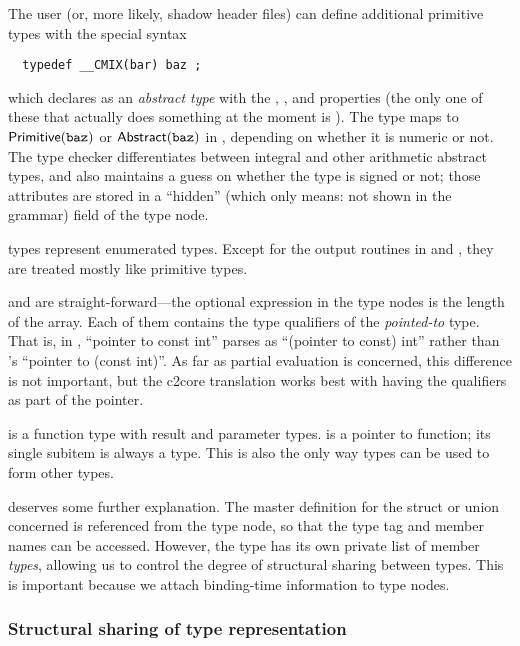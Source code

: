 \begin{docpart}
The user (or, more likely, shadow header files) can define additional
primitive types with the special syntax
\begin{verbatim}
  typedef __CMIX(bar) baz ;
\end{verbatim}
which declares  as an \emph{abstract type} with the ,
, and  properties (the only one of these that
actually does something at the moment is ). The type
maps to $\textsf{Primitive}(\texttt{baz})$ or
$\textsf{Abstract}(\texttt{baz})$ in \coreC, depending on whether
it is numeric or not. The type checker differentiates between integral
and other arithmetic abstract types, and also maintains a guess on
whether the type is signed or not; those attributes are stored in
a ``hidden'' (which only means: not shown in the \coreC grammar)
field of the  type node.

 types represent enumerated types. Except for the output
routines in  and , they are treated
mostly like primitive types.

 and  are straight-forward---the optional
expression in the  type nodes is the length of the array.
Each of them contains the type qualifiers of the \emph{pointed-to}
type. That is, in \coreC, ``pointer to const int'' parses as
``(pointer to const) int'' rather than \ansiC's
``pointer to (const int)''. As far as partial evaluation is concerned,
this difference is not important, but the c2core translation works
best with having the qualifiers as part of the pointer.

 is a function type with result and parameter types.
 is a pointer to function; its single subitem is always
a  type. This is also the only way  types can be
used to form other types.

 deserves some further explanation. The
master definition for the struct or union concerned is referenced
from the type node, so that the type tag and member names can be
accessed. However, the type has its own private list of member \emph{types},
allowing us to control the degree of structural sharing between types.
This is important because we attach binding-time information to type
nodes.

\subsubsection{Structural sharing of type representation}
\label{sec:corecTypeSharing}


\end{docpart}
